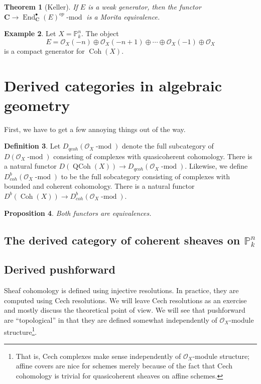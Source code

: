 \documentclass[10pt]{article}
\newtheorem{thm}{Theorem}[section]
\newtheorem{prop}[thm]{Proposition}
\theoremstyle{definition}
\newtheorem{exmp}[thm]{Example}
\newtheorem{defn}[thm]{Definition}
\DeclareMathOperator{\Coh}{Coh}
\DeclareMathOperator{\dmod}{-mod}
\DeclareMathOperator{\End}{End}
\DeclareMathOperator{\QCoh}{QCoh}
\newcommand{\cat}{\mathbf}
\newcommand{\PP}{\mathbb{P}}
\newcommand{\OO}{\mathcal{O}}
\newcommand{\todo}[1]{\textbf{\textcolor{red}{TODO #1}}}
\begin{document}
\begin{thm}[Keller]
If $E$ is a weak generator, then the functor $\cat{C} \rightarrow \End^\bullet_{\cat{C}}(E)^{op}\dmod$ is a Morita equivalence.
\end{thm}

\begin{exmp}
Let $X = \PP^n_k$.  The object 
$$E = \OO_X(-n) \oplus \OO_X(-n+1) \oplus \cdots \oplus \OO_X(-1) \oplus \OO_X$$
is a compact generator for $\Coh(X)$.
\end{exmp}


\newpage



\section{Derived categories in algebraic geometry}


First, we have to get a few annoying things out of the way.
\begin{defn}
Let $D_{qcoh}(\OO_X\dmod)$ denote the full subcategory of $D(\OO_X\dmod)$ consisting of complexes with quasicoherent cohomology.  There is a natural functor $D(\QCoh(X)) \rightarrow D_{qcoh}(\OO_X\dmod)$.  Likewise, we define $D_{coh}^b(\OO_X\dmod)$ to be the full sobcategory consisting of complexes with bounded and coherent cohomology.  There is a natural functor $D^b(\Coh(X)) \rightarrow D_{coh}^b(\OO_X\dmod)$.
\end{defn}

\begin{prop}
Both functors are equivalences.
\end{prop}


\subsection{The derived category of coherent sheaves on $\PP^n_k$}

\subsection{Derived pushforward}




Sheaf cohomology is defined using injective resolutions.  In practice, they are computed using Cech resolutions.  We will leave Cech resolutions as an exercise and mostly discuss the theoretical point of view.  We will see that pushforward are ``topological'' in that they are defined somewhat independently of $\OO_X$-module structure\footnote{That is, Cech complexes make sense independently of $\OO_X$-module structure; affine covers are nice for schemes merely because of the fact that Cech cohomology is trivial for quasicoherent sheaves on affine schemes.}.
\end{document}
